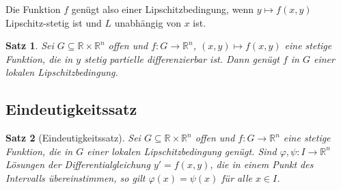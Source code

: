 \documentclass[a4paper, 11pt, accentcolor = tud3b]{tudreport}
\newtheorem{theorem}{Satz}[chapter]
\newcommand{\R}{\mathbb{R}}
\begin{document}
				Die Funktion \(f\) genügt also einer Lipschitzbedingung, wenn \( y \mapsto f(x, y) \) Lipschitz-stetig ist und \(L\) unabhängig von \(x\) ist.
				
				\begin{theorem}
					Sei \( G \subseteq \R \times \R^n \) offen und \( f : G \to \R^n \), \( (x, y) \mapsto f(x, y) \) eine stetige Funktion, die in \(y\) stetig partielle differenzierbar ist. Dann genügt \(f\) in \(G\) einer lokalen Lipschitzbedingung.
				\end{theorem}

			\subsection{Eindeutigkeitssatz}
				\begin{theorem}[Eindeutigkeitssatz]
					Sei \( G \subseteq \R \times \R^n \) offen und \( f : G \to \R^n \) eine stetige Funktion, die in \(G\) einer lokalen Lipschitzbedingung genügt. Sind \( \varphi, \psi : I \to \R^n \) Lösungen der Differentialgleichung \( y' = f(x, y) \), die in einem Punkt des Intervalls übereinstimmen, so gilt \( \varphi(x) = \psi(x) \) für alle \( x \in I \).
				\end{theorem}
\end{document}
